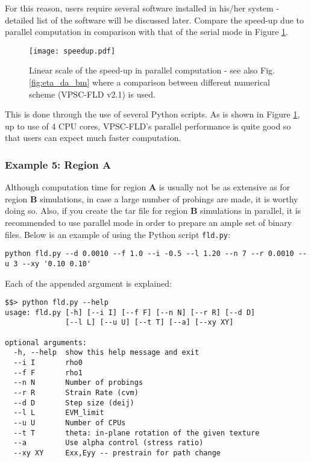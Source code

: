 \documentclass[12pt]{amsart}
\begin{document}
For this reason, users require several software installed in his/her system - detailed list of the software will be discussed later.
Compare the speed-up due to parallel computation in comparison with that of the serial mode in Figure \ref{fig:parallel_scale}.
\begin{figure}
  \texttt{[image: speedup.pdf]}
  \caption{Linear scale of the speed-up in parallel computation - see also Fig. \ref{fig:eta_da_bm} where a comparison between different numerical scheme (VPSC-FLD v2.1) is used.}
  \label{fig:parallel_scale}
\end{figure}
This is done through the use of several Python scripts.
As is shown in Figure \ref{fig:parallel_scale}, up to use of 4 CPU cores, VPSC-FLD's parallel performance is quite good so that users can expect much faster computation.

\subsubsection{Example 5: Region \textbf{A}}
\label{sec:par_ex_a}
Although computation time for region \textbf{A} is usually not be as extensive as for region \textbf{B} simulations, in case a large number of probings are made, it is worthy doing so.
Also, if you create the tar file for region \textbf{B} simulations in parallel, it is recommended to use parallel mode in order to prepare an ample set of binary files.
Below is an example of using the Python script \verb$fld.py$:
\begin{lstlisting}[style=sh, caption=An example command for parallel run for region \textbf{A} simulations]
python fld.py --d 0.0010 --f 1.0 --i -0.5 --l 1.20 --n 7 --r 0.0010 --u 3 --xy '0.10 0.10'
\end{lstlisting}
Each of the appended argument is explained:

\begin{lstlisting}[style=sh, caption=Block of FLa.sh]
$$> python fld.py --help
usage: fld.py [-h] [--i I] [--f F] [--n N] [--r R] [--d D]
              [--l L] [--u U] [--t T] [--a] [--xy XY]

optional arguments:
  -h, --help  show this help message and exit
  --i I       rho0
  --f F       rho1
  --n N       Number of probings
  --r R       Strain Rate (cvm)
  --d D       Step size (deij)
  --l L       EVM_limit
  --u U       Number of CPUs
  --t T       theta: in-plane rotation of the given texture
  --a         Use alpha control (stress ratio)
  --xy XY     Exx,Eyy -- prestrain for path change
\end{lstlisting}
\end{document}
